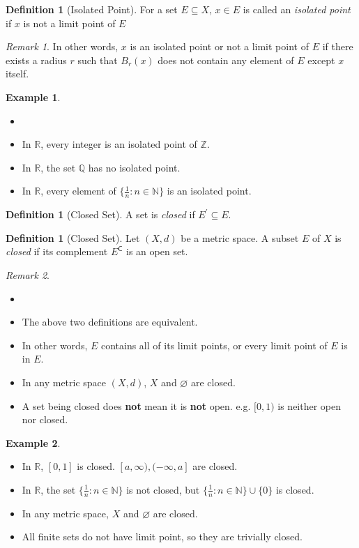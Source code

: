 \documentclass[12pt, lettersize]{book}
\theoremstyle{plain}
\theoremstyle{definition}
\newtheorem{dfn}[thm]{Definition}
\newtheorem*{eg}{Example}
\theoremstyle{remark}
\newtheorem*{rem}{Remark}
\newcommand{\R}{\mathbb{R}}
\newcommand{\N}{\mathbb{N}}
\newcommand{\Q}{\mathbb{Q}}
\newcommand{\com}{\mathsf{C}}
\let\emptyset\varnothing
\begin{document}
		\begin{dfn}[Isolated Point]
			For a set $E\subseteq X$, $x\in E$ is called an \emph{isolated point} if $x$ is not a limit point of $E$
		\end{dfn}
		\begin{rem}
			In other words, $x$ is an isolated point or not a limit point of $E$ if there exists a radius $r$ such that $B_r(x)$ does not contain any element of $E$ except $x$ itself.
		\end{rem}
		\begin{eg}
			\begin{itemize}
				\item[]
				\item In $\R$, every integer is an isolated point of $\mathbb{Z}$.
				\item In $\R$, the set $\Q$ has no isolated point.
				\item In $\R$, every element of $\{\frac{1}{n}: n\in\N\}$ is an isolated point. 
			\end{itemize}
		\end{eg}
		
		\begin{dfn}[Closed Set]
			A set is \emph{closed} if $E^\prime\subseteq E$.
		\end{dfn}
		\begin{dfn}[Closed Set]
			Let $(X,d)$ be a metric space. A subset $E$ of $X$ is \emph{closed} if its complement $E^\com$ is an open set.
		\end{dfn}
		\begin{rem}
			\begin{itemize}
				\item[]
				\item The above two definitions are equivalent.
				\item In other words, $E$ contains all of its limit points, or every limit point of $E$ is in $E$.
				\item In any metric space $(X,d)$, $X$ and $\emptyset$ are closed.
				\item A set being closed does \textbf{not} mean it is \textbf{not} open. e.g. $[0,1)$ is neither open nor closed.
			\end{itemize}
		\end{rem}
		\begin{eg}
			\begin{itemize}
				\item In $\R$, $[0,1]$ is closed. $[a,\infty),(-\infty,a]$ are closed.
				\item In $\R$, the set $\{\frac{1}{n}: n\in\N\}$ is not closed, but $\{\frac{1}{n}: n\in\N\}\cup\{0\}$ is closed.
				\item In any metric space, $X$ and $\emptyset$ are closed.
				\item All finite sets do not have limit point, so they are trivially closed.
			\end{itemize}
		\end{eg}
		
\end{document}
